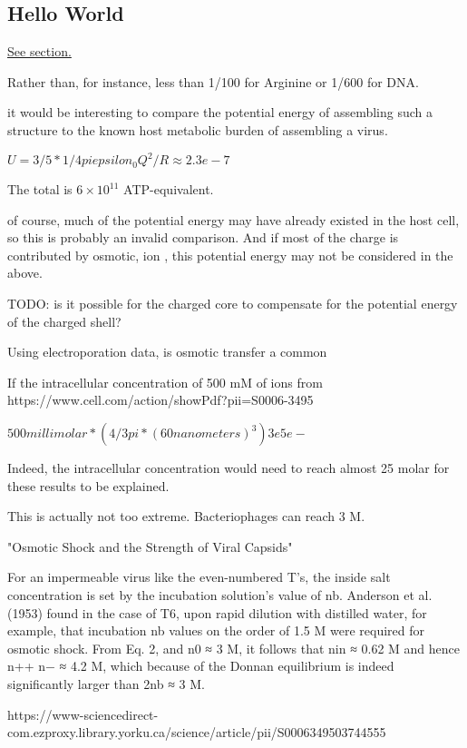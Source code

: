 \documentclass[paper.tex]{subfiles}
\begin{document}
\subsection{Hello World}
\label{sec:hello}


\hyperref[sec:hello]{See section.}


Rather than, for instance, less than 1/100 for Arginine or 1/600 for DNA.



it would be interesting to compare the potential energy of assembling such a structure to the known host metabolic burden of assembling a virus.


$U = 3/5 * 1/4 pi epsilon_0 Q^2 / R \approx 2.3e-7 $

The total is $6 \times 10^11$ ATP-equivalent.


of course, much of the potential energy may have already existed in the host cell, so this is probably an invalid comparison. And if most of the charge is contributed by osmotic, ion , this potential energy may not be considered in the above. 

\begin{autem}
TODO: is it possible for the charged core to compensate for the potential energy of the charged shell?
\end{autem}










Using electroporation data, is osmotic transfer a common 

If the intracellular concentration of 500 mM of ions  from https://www.cell.com/action/showPdf?pii=S0006-3495%


$500 millimolar * (4/3 pi * ( 60 nanometers)^3)  3e5 e-$


Indeed, the intracellular concentration would need to reach almost 25 molar for these results to be explained.

This is actually not too extreme. Bacteriophages can reach 3 M.

"Osmotic Shock and the Strength of Viral Capsids"


For an impermeable virus like the even-numbered T's, the inside salt concentration is set by the incubation solution's value of nb. Anderson et al. (1953) found in the case of T6, upon rapid dilution with distilled water, for example, that incubation nb values on the order of 1.5 M were required for osmotic shock. From Eq. 2, and n0 ≈ 3 M, it follows that nin ≈ 0.62 M and hence n++ n− ≈ 4.2 M, which because of the Donnan equilibrium is indeed significantly larger than 2nb ≈ 3 M.

https://www-sciencedirect-com.ezproxy.library.yorku.ca/science/article/pii/S0006349503744555
\end{document}

